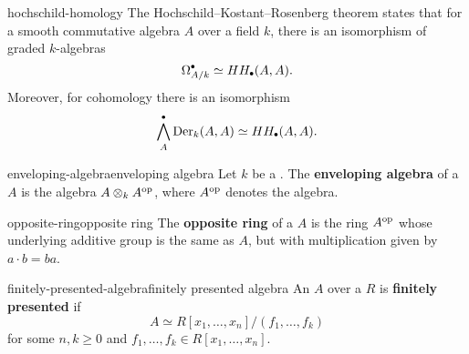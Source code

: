 \begin{example}{hochschild-homology}
    The Hochschild--Kostant--Rosenberg theorem states that for a smooth  commutative algebra $A$ over a field $k$, there is an isomorphism of graded $k$-algebras
    \[ \Omega^\bdot_{A/k} \simeq HH_\bdot(A, A) . \]
    Moreover, for cohomology there is an isomorphism
    \[ \bigwedge^\bdot_A \textup{Der}_k(A, A) \simeq HH_\bdot(A, A) . \]
\end{example}

\begin{topic}{enveloping-algebra}{enveloping algebra}
    Let $k$ be a . The \textbf{enveloping algebra} of a  $A$ is the algebra $A \otimes_k A^\textup{op}$, where $A^\textup{op}$ denotes the  algebra.
\end{topic}

\begin{topic}{opposite-ring}{opposite ring}
    The \textbf{opposite ring} of a  $A$ is the ring $A^\textup{op}$ whose underlying additive group is the same as $A$, but with multiplication given by $a \cdot b = ba$.
\end{topic}

\begin{topic}{finitely-presented-algebra}{finitely presented algebra}
    An  $A$ over a  $R$ is \textbf{finitely presented} if
    \[ A \simeq R[x_1, \ldots, x_n] / (f_1, \ldots, f_k) \]
    for some $n, k \ge 0$ and $f_1, \ldots, f_k \in R[x_1, \ldots, x_n]$.
\end{topic}
